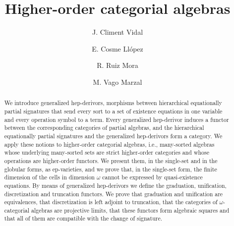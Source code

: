 \documentclass[a4paper,reqno]{amsart}
\theoremstyle{plain}
\theoremstyle{definition}
\begin{document}
\title{Higher-order categorial algebras}

\author[Climent]{J. Climent Vidal}
\address{Universitat de Val\`{e}ncia\\
         Departament de L\`{o}gica i Filosofia de la Ci\`{e}ncia}

\author[Cosme]{E. Cosme Ll\'{o}pez}
\address{Universitat de Val\`{e}ncia\\
         Departament de Matem\`{a}tiques\\ and
         Nantong University\\
         School of Mathematics and Statistics}

\author[Ruiz]{R. Ruiz Mora}
\address{Universitat de Val\`{e}ncia\\
         Departament de Matem\`{a}tiques}

\author[Vago]{M. Vago Marzal}

\begin{abstract}
We introduce generalized hep-derivors, morphisms between hierarchical equationally partial signatures that send every sort to a set of existence equations in one variable and every operation symbol to a term.
Every generalized hep-derivor induces a functor between the corresponding categories of partial algebras, and the hierarchical equationally partial signatures and the generalized hep-derivors form a category.
We apply these notions to higher-order categorial algebras, i.e., many-sorted algebras whose underlying many-sorted sets are strict higher-order categories and whose operations are higher-order functors.
We present them, in the single-set and in the globular forms, as ep-varieties, and we prove that, in the single-set form, the finite dimension of the cells in dimension $\omega$ cannot be expressed by quasi-existence equations.
By means of generalized hep-derivors we define the graduation, unification, discretization and truncation functors.
We prove that graduation and unification are equivalences, that discretization is left adjoint to truncation, that the categories of $\omega$-categorial algebras are projective limits, that these functors form algebraic squares and that all of them are compatible with the change of signature.
\end{abstract}

\maketitle
\end{document}
